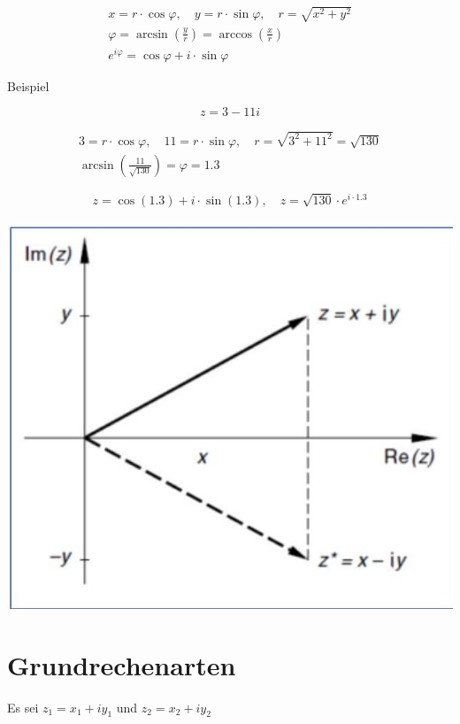 \documentclass[10pt]{article}
\begin{document}
$$
\begin{gathered}
x=r \cdot \cos \varphi, \quad y=r \cdot \sin \varphi, \quad r=\sqrt{x^{2}+y^{2}} \\
\varphi=\arcsin \left(\frac{y}{r}\right)=\arccos \left(\frac{x}{r}\right) \\
e^{i \varphi}=\cos \varphi+i \cdot \sin \varphi
\end{gathered}
$$

Beispiel

$$
z=3-11 i
$$

$$
\begin{gathered}
3=r \cdot \cos \varphi, \quad 11=r \cdot \sin \varphi, \quad r=\sqrt{3^{2}+11^{2}}=\sqrt{130} \\
\arcsin \left(\frac{11}{\sqrt{130}}\right)=\varphi=1.3
\end{gathered}
$$

$$
z=\cos (1.3)+i \cdot \sin (1.3), \quad z=\sqrt{130} \cdot e^{i \cdot 1.3}
$$

\begin{center}
\includegraphics[width=\linewidth]{images/2024_12_29_68ccba06d0091c162fa4g-11}
\end{center}

\section*{Grundrechenarten}
Es sei $z_{1}=x_{1}+i y_{1}$ und $z_{2}=x_{2}+i y_{2}$
\end{document}

